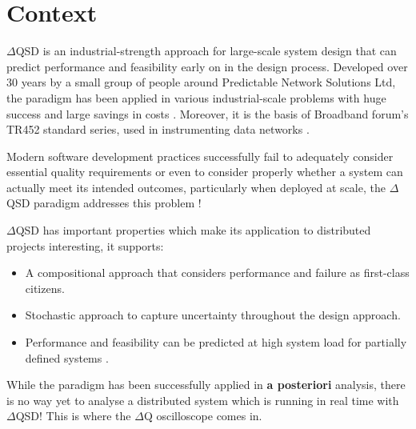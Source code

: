 \section{Context}
    $\Delta$QSD is an industrial-strength approach for large-scale system design that can predict performance and feasibility early on in the design process.  
    Developed over 30 years by a small group of people around Predictable Network Solutions Ltd, the paradigm has been applied in various industrial-scale problems with huge success and large savings in costs \cite{dq-tut}. Moreover, it is the basis of Broadband forum's TR452 standard series, used in instrumenting data networks \cite{dq-br}.

    Modern software development practices successfully fail to adequately consider essential quality requirements or even to consider properly whether a system can actually meet its intended outcomes, particularly when deployed at scale, the $\Delta$QSD paradigm addresses this problem \cite{art}! 

       $\Delta$QSD has important properties which make its application to distributed projects interesting, it supports:
    \begin{itemize}
        \item A compositional approach that considers performance and failure as first-class citizens. 
        \item Stochastic approach to capture uncertainty throughout the design approach.
        \item Performance and feasibility can be predicted at high system load for partially defined systems \cite{dq-tut}.
    \end{itemize}
    
    While the paradigm has been successfully applied in \textbf{a posteriori} analysis, there is no way yet to analyse a distributed system which is running in real time with $\Delta$QSD! This is where the $\Delta$Q oscilloscope comes in. 
